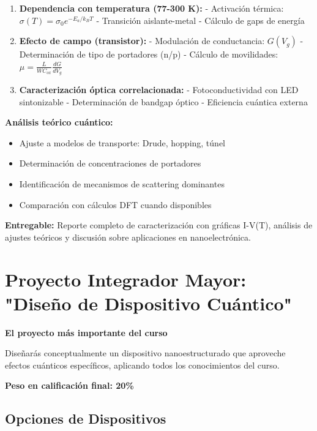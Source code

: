 \begin{tecnologiabox}
\begin{tecnologiabox}
\begin{tecnologiabox}
\begin{practicabox}
\begin{enumerate}
		\item \textbf{Dependencia con temperatura (77-300 K):}
		- Activación térmica: $\sigma(T) = \sigma_0 e^{-E_a/k_BT}$
		- Transición aislante-metal
		- Cálculo de gaps de energía
		
		\item \textbf{Efecto de campo (transistor):}
		- Modulación de conductancia: $G(V_g)$
		- Determinación de tipo de portadores (n/p)
		- Cálculo de movilidades: $\mu = \frac{L}{WC_{ox}} \frac{dG}{dV_g}$
		
		\item \textbf{Caracterización óptica correlacionada:}
		- Fotoconductividad con LED sintonizable
		- Determinación de bandgap óptico
		- Eficiencia cuántica externa
	\end{enumerate}
	
	\textbf{Análisis teórico cuántico:}
	\begin{itemize}
		\item Ajuste a modelos de transporte: Drude, hopping, túnel
		\item Determinación de concentraciones de portadores
		\item Identificación de mecanismos de scattering dominantes
		\item Comparación con cálculos DFT cuando disponibles
	\end{itemize}
	
	\textbf{Entregable:} Reporte completo de caracterización con gráficas I-V(T), análisis de ajustes teóricos y discusión sobre aplicaciones en nanoelectrónica.
\end{practicabox}

\section{Proyecto Integrador Mayor: "Diseño de Dispositivo Cuántico"}

\begin{objetivobox}
	\textbf{El proyecto más importante del curso}
	
	Diseñarás conceptualmente un dispositivo nanoestructurado que aproveche efectos cuánticos específicos, aplicando todos los conocimientos del curso.
	
	\textbf{Peso en calificación final: 20\%}
\end{objetivobox}

\subsection{Opciones de Dispositivos}


\end{tecnologiabox}
\end{tecnologiabox}
\end{tecnologiabox}
